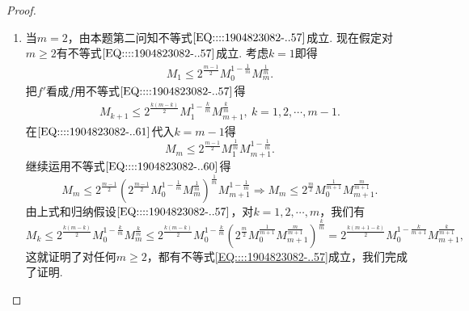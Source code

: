 \documentclass[../../main.tex]{subfiles}
\begin{document}
\begin{proof}
\begin{enumerate}
\item 当\( m = 2 \)，由本题第二问知不等式\(\eqref{EQ::::1904823082-..57}\)成立. 现在假定对\( m \geqslant 2 \)有不等式\(\eqref{EQ::::1904823082-..57}\)成立. 考虑\( k = 1 \)即得
\begin{align}
M_1 \leqslant 2^{\frac{m - 1}{2}} M_0^{1 - \frac{1}{m}} M_m^{\frac{1}{m}}. \label{EQ::::1904823082-..60}
\end{align}
把\( f' \)看成\( f \)用不等式\(\eqref{EQ::::1904823082-..57}\)得
\begin{align}
M_{k + 1} \leqslant 2^{\frac{k(m - k)}{2}} M_1^{1 - \frac{k}{m}} M_{m + 1}^{\frac{k}{m}}, \ k = 1,2,\cdots, m - 1. \label{EQ::::1904823082-..61}
\end{align}
在\(\eqref{EQ::::1904823082-..61}\)代入\( k = m - 1 \)得
\[
M_m \leqslant 2^{\frac{m - 1}{2}} M_1^{\frac{1}{m}} M_{m + 1}^{1 - \frac{1}{m}}.
\]
继续运用不等式\(\eqref{EQ::::1904823082-..60}\)得
\[
M_m \leqslant 2^{\frac{m - 1}{2}} \left( 2^{\frac{m - 1}{2}} M_0^{1 - \frac{1}{m}} M_m^{\frac{1}{m}} \right)^{\frac{1}{m}} M_{m + 1}^{1 - \frac{1}{m}} \Rightarrow M_m \leqslant 2^{\frac{m}{2}} M_0^{\frac{1}{m + 1}} M_{m + 1}^{\frac{m}{m + 1}}.
\]
由上式和归纳假设\(\eqref{EQ::::1904823082-..57}\)，对\( k = 1,2,\cdots, m \)，我们有
\[
M_k \leqslant 2^{\frac{k(m - k)}{2}} M_0^{1 - \frac{k}{m}} M_m^{\frac{k}{m}} \leqslant 2^{\frac{k(m - k)}{2}} M_0^{1 - \frac{k}{m}} \left( 2^{\frac{m}{2}} M_0^{\frac{1}{m + 1}} M_{m + 1}^{\frac{m}{m + 1}} \right)^{\frac{k}{m}} = 2^{\frac{k(m + 1 - k)}{2}} M_0^{1 - \frac{k}{m + 1}} M_{m + 1}^{\frac{k}{m + 1}},
\]
这就证明了对任何\( m \geqslant 2 \)，都有不等式\eqref{EQ::::1904823082-..57}成立，我们完成了证明.
\end{enumerate}

\end{proof}
\end{document}

